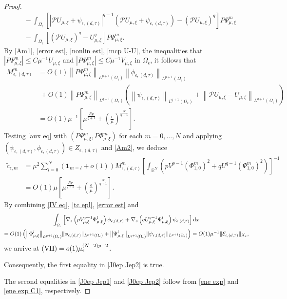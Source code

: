 \documentclass[reqno]{amsart}
\theoremstyle{remark}
\newcommand{\ep}{\epsilon}
\newcommand{\R}{\mathbb{R}}
\newcommand{\mone}{\mathbf{1}}
\newcommand{\mce}{\mathcal{E}}
\newcommand{\mcp}{\mathcal{P}}
\newcommand{\tc}{\tilde{c}}
\newcommand{\dx}{\textup{d}x}
\newcommand{\mx}{{\mu,\xi}}
\renewcommand{\(}{\left(}
\renewcommand{\)}{\right)}
\numberwithin{equation}{section}
\begin{document}
\begin{proof}
\begin{equation}
\begin{aligned}
&\ - \int_{\Omega_\ep} \left[|\mcp U_\mx+\psi_{\ep,(d,\tau)}|^{q-1} \(\mcp U_\mx+\psi_{\ep,(d,\tau)}\)-(\mcp U_\mx)^q\right] P\Psi_\mx^m \\
&\ - \int_{\Omega_\ep} \left[(\mcp U_\mx)^q-U_\mx^q\right] P\Psi_\mx^m.
\end{aligned}
\end{equation}
By \eqref{Am1}, \eqref{error est}, \eqref{nonlin est}, \eqref{mcp U-U}, the inequalities that $|P\Psi_\mx^m| \le C\mu^{-1} U_\mx$ and $|P\Phi_\mx^m| \le C\mu^{-1} V_\mx$ in $\Omega_\ep$, it follows that
\begin{equation}\label{Am2}
\begin{aligned}
M_{\ep,(d,\tau)}^m &= O(1) \left\|P\Phi_\mx^m\right\|_{L^{p+1}(\Omega_\ep)} \left\|\phi_{\ep,(d,\tau)}\right\|_{L^{p+1}(\Omega_\ep)} \\
&\ + O(1) \left\|P\Psi_\mx^m\right\|_{L^{q+1}(\Omega_\ep)} \(\left\|\psi_{\ep,(d,\tau)}\right\|_{L^{q+1}(\Omega_\ep)} + \left\|\mcp U_\mx-U_\mx\right\|_{L^{q+1}(\Omega_\ep)}\) \\
&= O(1)\mu^{-1}\left[\mu^{\frac{Np}{q+1}} + \(\frac{\ep}{\mu}\)^{\frac{N}{q+1}}\right].
\end{aligned}
\end{equation}
Testing \eqref{aux eq} with $(P\Psi_\mx^m,P\Phi_\mx^m)$ for each $m = 0,\ldots,N$ and applying $(\psi_{\ep,(d,\tau)},\phi_{\ep,(d,\tau)}) \in Z_{\ep,(d,\tau)}$ and \eqref{Am2}, we deduce
\begin{equation}\label{tc epl}
\begin{aligned}
\tc_{\ep,m} &= \mu^2 \sum_{l=0}^N (\mone_{m=l} + o(1)) M_{\ep,(d,\tau)}^m \left[\int_{\R^N} \(pV^{p-1}(\Phi_{1,0}^m)^2 + qU^{q-1}(\Psi_{1,0}^m)^2\)\right]^{-1}\\
&= O(1)\mu\left[\mu^{\frac{Np}{q+1}} + \(\frac{\ep}{\mu}\)^{\frac{N}{q+1}}\right].
\end{aligned}
\end{equation}
By combining \eqref{IV eq}, \eqref{tc epl}, \eqref{error est} and
\begin{multline*}
\int_{\Omega_\ep} \left[\nabla_s\(p V_\mx^{p-1} \Phi_\mx^l\) \phi_{\ep,(d,\tau)} + \nabla_s\(q U_\mx^{q-1} \Psi_\mx^l\) \psi_{\ep,(d,\tau)}\right]\dx\\
= O(1) \(\big\|\Phi_\mx^l\big\|_{L^{p+1}(\Omega_\ep)} \|\phi_{\ep,(d,\tau)}\|_{L^{p+1}(\Omega_\ep)}
+ \big\| \Psi_\mx^l\big\|_{L^{q+1}(\Omega_\ep)} \|\psi_{\ep,(d,\tau)}\|_{L^{q+1}(\Omega_\ep)}\) = O(1)\mu^{-1} \|\mce_{\ep,(d,\tau)}\|_{X_\ep},
\end{multline*}
we arrive at $\textup{(VII)} = o(1)\mu_\ep^{(N-2)p-2}$.

Consequently, the first equality in \eqref{J0ep Jep2} is true.

\medskip
The second equalities in \eqref{J0ep Jep1} and \eqref{J0ep Jep2} follow from \eqref{ene exp} and \eqref{ene exp C1}, respectively.
\end{proof}
\end{document}
